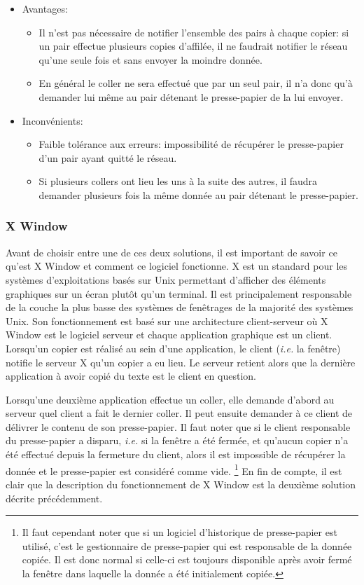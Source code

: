 \begin{itemize}
\item Avantages:
  \begin{itemize}
  \item Il n'est pas nécessaire de notifier l'ensemble des pairs à chaque
    copier: si un pair effectue plusieurs copies d'affilée, il ne faudrait
    notifier le réseau qu'une seule fois et sans envoyer la moindre donnée.
  \item En général le coller ne sera effectué que par un seul pair,
    il n'a donc qu'à demander lui même au pair détenant le presse-papier
    de la lui envoyer.
  \end{itemize}
\item Inconvénients:
  \begin{itemize}
  \item Faible tolérance aux erreurs: impossibilité de récupérer le
    presse-papier d'un pair ayant quitté le réseau.
  \item Si plusieurs collers ont lieu les uns à la suite des autres, il faudra
    demander plusieurs fois la même donnée au pair détenant le presse-papier.\\
  \end{itemize}
\end{itemize}

\subsubsection{X Window}
Avant de choisir entre une de ces deux solutions, il est important de
savoir ce qu'est X Window et comment ce logiciel fonctionne\cite{nye1992xlib}.
X est un standard pour les systèmes d'exploitations basés sur Unix permettant
d'afficher des éléments graphiques sur un écran plutôt qu'un terminal.
Il est principalement responsable de la couche la plus basse des systèmes
de fenêtrages de la majorité des systèmes Unix. Son fonctionnement est basé
sur une architecture client-serveur où X Window est le logiciel serveur
et chaque application graphique est un client. Lorsqu'un copier est réalisé au
sein d'une application, le client (\emph{i.e.} la fenêtre) notifie le serveur X
qu'un copier a eu lieu. Le serveur retient alors que la dernière application
à avoir copié du texte est le client en question.

Lorsqu'une deuxième
application effectue un coller, elle demande d'abord au serveur quel client
a fait le dernier coller. Il peut ensuite demander à ce client de délivrer
le contenu de son presse-papier. Il faut noter que si le client responsable
du presse-papier a disparu, \emph{i.e.} si la fenêtre a été fermée, et qu'aucun
copier n'a été effectué depuis la fermeture du client, alors il est
impossible de récupérer la donnée et le presse-papier est considéré comme vide.
\footnote{Il faut cependant noter que si un logiciel d'historique de
presse-papier est utilisé, c'est le gestionnaire de presse-papier qui est
responsable de la donnée copiée. Il est donc normal si celle-ci est toujours
disponible après avoir fermé la fenêtre dans laquelle la donnée a été
initialement copiée.}
En fin de compte, il est clair que la description du fonctionnement de X Window
est la deuxième solution décrite précédemment.

